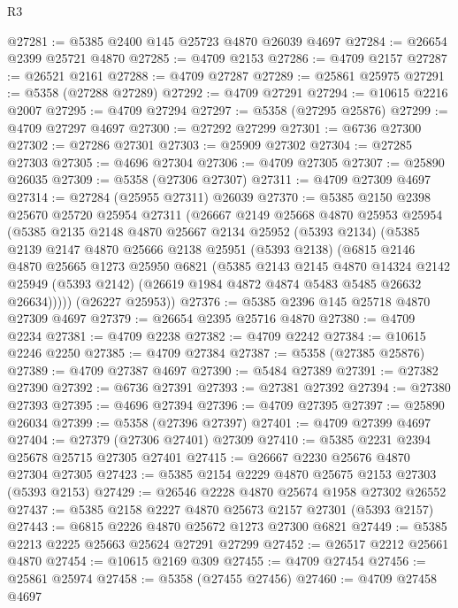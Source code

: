 \begin{lexlean}{R3}
\begin{coremodule}
@27281 := @5385 @2400 @145 @25723 @4870 @26039 @4697
@27284 := @26654 @2399 @25721 @4870
@27285 := @4709 @2153
@27286 := @4709 @2157
@27287 := @26521 @2161
@27288 := @4709 @27287
@27289 := @25861 @25975
@27291 := @5358 (@27288 @27289)
@27292 := @4709 @27291
@27294 := @10615 @2216 @2007
@27295 := @4709 @27294
@27297 := @5358 (@27295 @25876)
@27299 := @4709 @27297 @4697
@27300 := @27292 @27299
@27301 := @6736 @27300
@27302 := @27286 @27301
@27303 := @25909 @27302
@27304 := @27285 @27303
@27305 := @4696 @27304
@27306 := @4709 @27305
@27307 := @25890 @26035
@27309 := @5358 (@27306 @27307)
@27311 := @4709 @27309 @4697
@27314 := @27284 (@25955 @27311) @26039
@27370 := @5385
    @2150
    @2398
    @25670
    @25720
    @25954
    @27311
    (@26667
      @2149
      @25668
      @4870
      @25953
      @25954
      (@5385
        @2135
        @2148
        @4870
        @25667
        @2134
        @25952
        (@5393 @2134)
        (@5385
          @2139
          @2147
          @4870
          @25666
          @2138
          @25951
          (@5393 @2138)
          (@6815
            @2146
            @4870
            @25665
            @1273
            @25950
            @6821
            (@5385
              @2143
              @2145
              @4870
              @14324
              @2142
              @25949
              (@5393 @2142)
              (@26619 @1984 @4872 @4874 @5483 @5485 @26632 @26634)))))
      (@26227 @25953))
@27376 := @5385 @2396 @145 @25718 @4870 @27309 @4697
@27379 := @26654 @2395 @25716 @4870
@27380 := @4709 @2234
@27381 := @4709 @2238
@27382 := @4709 @2242
@27384 := @10615 @2246 @2250
@27385 := @4709 @27384
@27387 := @5358 (@27385 @25876)
@27389 := @4709 @27387 @4697
@27390 := @5484 @27389
@27391 := @27382 @27390
@27392 := @6736 @27391
@27393 := @27381 @27392
@27394 := @27380 @27393
@27395 := @4696 @27394
@27396 := @4709 @27395
@27397 := @25890 @26034
@27399 := @5358 (@27396 @27397)
@27401 := @4709 @27399 @4697
@27404 := @27379 (@27306 @27401) @27309
@27410 := @5385 @2231 @2394 @25678 @25715 @27305 @27401
@27415 := @26667 @2230 @25676 @4870 @27304 @27305
@27423 := @5385 @2154 @2229 @4870 @25675 @2153 @27303 (@5393 @2153)
@27429 := @26546 @2228 @4870 @25674 @1958 @27302 @26552
@27437 := @5385 @2158 @2227 @4870 @25673 @2157 @27301 (@5393 @2157)
@27443 := @6815 @2226 @4870 @25672 @1273 @27300 @6821
@27449 := @5385 @2213 @2225 @25663 @25624 @27291 @27299
@27452 := @26517 @2212 @25661 @4870
@27454 := @10615 @2169 @309
@27455 := @4709 @27454
@27456 := @25861 @25974
@27458 := @5358 (@27455 @27456)
@27460 := @4709 @27458 @4697

\end{coremodule}
\end{lexlean}
